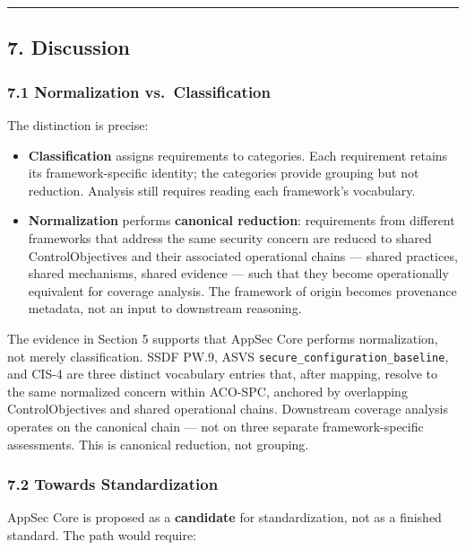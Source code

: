 \documentclass[
]{article}
\begin{document}
\begin{center}\rule{0.5\linewidth}{0.5pt}\end{center}

\subsection{7. Discussion}\label{discussion}

\subsubsection{7.1 Normalization
vs.~Classification}\label{normalization-vs.-classification}

The distinction is precise:

\begin{itemize}
\item
  \textbf{Classification} assigns requirements to categories. Each
  requirement retains its framework-specific identity; the categories
  provide grouping but not reduction. Analysis still requires reading
  each framework's vocabulary.
\item
  \textbf{Normalization} performs \textbf{canonical reduction}:
  requirements from different frameworks that address the same security
  concern are reduced to shared ControlObjectives and their associated
  operational chains --- shared practices, shared mechanisms, shared
  evidence --- such that they become operationally equivalent for
  coverage analysis. The framework of origin becomes provenance
  metadata, not an input to downstream reasoning.
\end{itemize}

The evidence in Section 5 supports that AppSec Core performs
normalization, not merely classification. SSDF PW.9, ASVS
\texttt{secure\_configuration\_baseline}, and CIS-4 are three distinct
vocabulary entries that, after mapping, resolve to the same normalized
concern within ACO-SPC, anchored by overlapping ControlObjectives and
shared operational chains. Downstream coverage analysis operates on the
canonical chain --- not on three separate framework-specific
assessments. This is canonical reduction, not grouping.

\subsubsection{7.2 Towards
Standardization}\label{towards-standardization}

AppSec Core is proposed as a \textbf{candidate} for standardization, not
as a finished standard. The path would require:
\end{document}

